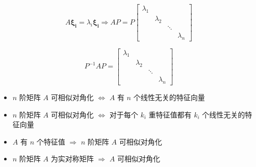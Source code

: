 \begin{theorem}[相似对角化充要条件]
	$$A\boldsymbol{\xi_{i}} = \lambda_{i} \boldsymbol{\xi_{i}} \Rightarrow 
	AP = P\begin{bmatrix}
		\lambda_{1} &             &        &           \\
		            & \lambda_{2} &        &           \\
		            &             & \ddots &           \\
		            &             &        & \lambda_{n}
	\end{bmatrix}$$

	$$P^{-1}AP = \begin{bmatrix}
		\lambda_{1} &             &        &           \\
		            & \lambda_{2} &        &           \\
		            &             & \ddots &           \\
		            &             &        & \lambda_{n}
	\end{bmatrix}$$
\end{theorem}

\begin{corollary}[对角化]
	\begin{itemize}
		\item $n$ 阶矩阵 $A$ 可相似对角化 $\Leftrightarrow$ $A$ 有 $n$ 个线性无关的特征向量
		\item $n$ 阶矩阵 $A$ 可相似对角化 $\Leftrightarrow$ 对于每个 $k_{i}$ 重特征值都有 $k_{i}$ 个线性无关的特征向量
		\item $A$ 有 $n$ 个特征值 $\Rightarrow$ $n$ 阶矩阵 $A$ 可相似对角化
		\item $n$ 阶矩阵 $A$ 为实对称矩阵 $\Rightarrow$ $A$ 可相似对角化
	\end{itemize}
\end{corollary}

